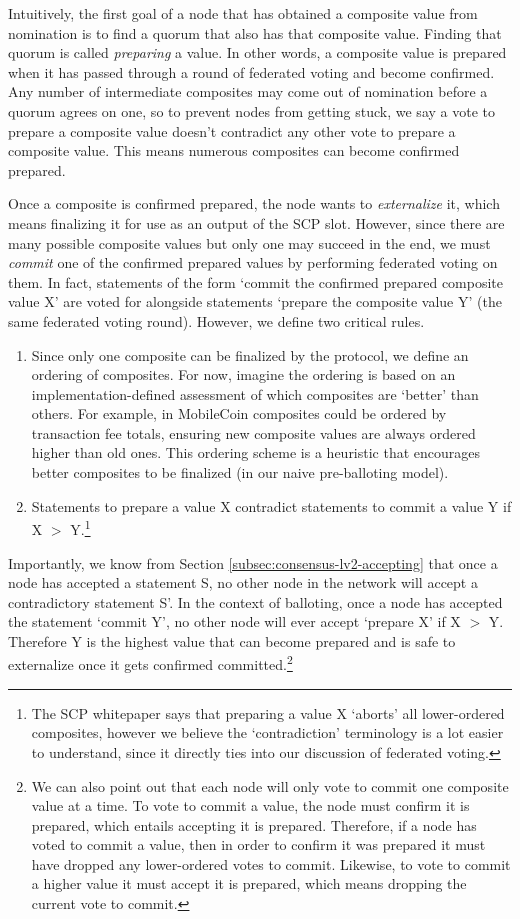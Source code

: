 Intuitively, the first goal of a node that has obtained a composite value from nomination is to find a quorum that also has that composite value. Finding that quorum is called {\em preparing} a value. In other words, a composite value is prepared when it has passed through a round of federated voting and become confirmed. Any number of intermediate composites may come out of nomination before a quorum agrees on one, so to prevent nodes from getting stuck, we say a vote to prepare a composite value doesn't contradict any other vote to prepare a composite value. This means numerous composites can become confirmed prepared.

Once a composite is confirmed prepared, the node wants to {\em externalize} it, which means finalizing it for use as an output of the SCP slot. However, since there are many possible composite values but only one may succeed in the end, we must {\em commit} one of the confirmed prepared values by performing federated voting on them. In fact, statements of the form `commit the confirmed prepared composite value X' are voted for alongside statements `prepare the composite value Y' (the same federated voting round). However, we define two critical rules.
\begin{enumerate}
    \item Since only one composite can be finalized by the protocol, we define an ordering of composites. For now, imagine the ordering is based on an implementation-defined assessment of which composites are `better' than others. For example, in MobileCoin composites could be ordered by transaction fee totals, ensuring new composite values are always ordered higher than old ones. This ordering scheme is a heuristic that encourages better composites to be finalized (in our naive pre-balloting model).

    \item Statements to prepare a value X contradict statements to commit a value Y if X $>$ Y.\footnote{The SCP whitepaper \cite{stellar-consensus-protocol} says that preparing a value X `aborts' all lower-ordered composites, however we believe the `contradiction' terminology is a lot easier to understand, since it directly ties into our discussion of federated voting.}
\end{enumerate}

Importantly, we know from Section \ref{subsec:consensus-lv2-accepting} that once a node has accepted a statement S, no other node in the network will accept a contradictory statement S'. In the context of balloting, once a node has accepted the statement `commit Y', no other node will ever accept `prepare X' if X $>$ Y. Therefore Y is the highest value that can become prepared and is safe to externalize once it gets confirmed committed.\footnote{We can also point out that each node will only vote to commit one composite value at a time. To vote to commit a value, the node must confirm it is prepared, which entails accepting it is prepared. Therefore, if a node has voted to commit a value, then in order to confirm it was prepared it must have dropped any lower-ordered votes to commit. Likewise, to vote to commit a higher value it must accept it is prepared, which means dropping the current vote to commit.}

